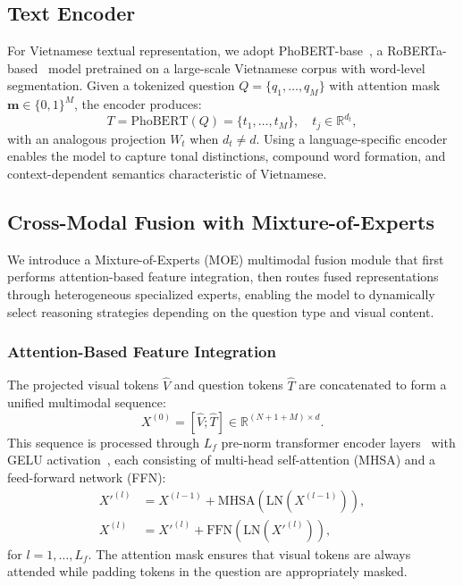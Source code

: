 \subsection{Text Encoder}
\label{sec:method:text}

For Vietnamese textual representation, we adopt PhoBERT-base~\cite{nguyen2020phobert}, a RoBERTa-based~\cite{liu2019roberta} model pretrained on a large-scale Vietnamese corpus with word-level segmentation. Given a tokenized question $Q = \{q_1, \ldots, q_M\}$ with attention mask $\mathbf{m} \in \{0,1\}^M$, the encoder produces:
\begin{equation}
    T = \text{PhoBERT}(Q) = \{t_1, \ldots, t_M\}, \quad t_j \in \mathbb{R}^{d_t},
    \label{eq:text_enc}
\end{equation}
with an analogous projection $W_t$ when $d_t \neq d$. Using a language-specific encoder enables the model to capture tonal distinctions, compound word formation, and context-dependent semantics characteristic of Vietnamese.

\subsection{Cross-Modal Fusion with Mixture-of-Experts}
\label{sec:method:fusion}

We introduce a Mixture-of-Experts (MOE) multimodal fusion module that first performs attention-based feature integration, then routes fused representations through heterogeneous specialized experts, enabling the model to dynamically select reasoning strategies depending on the question type and visual content.

\subsubsection{Attention-Based Feature Integration}
\label{sec:method:fusion:attention}

The projected visual tokens $\hat{V}$ and question tokens $\hat{T}$ are concatenated to form a unified multimodal sequence:
\begin{equation}
    X^{(0)} = [\hat{V}; \hat{T}] \in \mathbb{R}^{(N+1+M) \times d}.
    \label{eq:concat_features}
\end{equation}
This sequence is processed through $L_f$ pre-norm transformer encoder layers~\cite{ba2016layer} with GELU activation~\cite{hendrycks2016gaussian}, each consisting of multi-head self-attention (MHSA) and a feed-forward network (FFN):
\begin{align}
    X'^{(l)} &= X^{(l-1)} + \text{MHSA}\!\left(\text{LN}(X^{(l-1)})\right), \\
    X^{(l)}  &= X'^{(l)} + \text{FFN}\!\left(\text{LN}(X'^{(l)})\right),
\end{align}
for $l = 1, \ldots, L_f$. The attention mask ensures that visual tokens are always attended while padding tokens in the question are appropriately masked.

